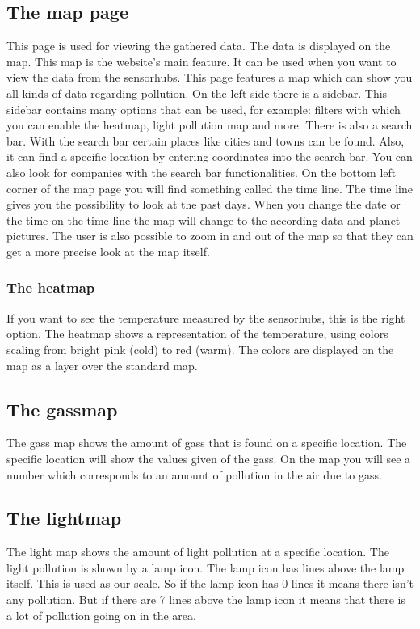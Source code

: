 \documentclass[a4paper]{article}
\begin{document}
\subsection{The map page}
This page is used for viewing the gathered data. The data is displayed on the map. This map is the website's main feature. It can be used when you want to view the data from the sensorhubs.
\newline
This page features a map which can show you all kinds of data regarding pollution. On the left side there is a sidebar. This sidebar contains many options that can be used, for example: filters with which you can enable the heatmap, light pollution map and more.
\newline
There is also a search bar. With the search bar certain places like cities and towns can be found. Also, it can find a specific location by entering coordinates into the search bar. You can also look for companies with the search bar functionalities.
\newline
On the bottom left corner of the map page you will find something called the time line. The time line gives you the possibility to look at the past days. When you change the date or the time on the time line the map will change to the according data and planet pictures.  
\newline
The user is also possible to zoom in and out of the map so that they can get a more precise look at the map itself. 
\newline

\subsubsection{The heatmap}
If you want to see the temperature measured by the sensorhubs, this is the right option.
The heatmap shows a representation of the temperature, using colors scaling from bright pink (cold) to red (warm). The colors are displayed on the map as a layer over the standard map.
\newline
\subsection{The gassmap} 
The gass map shows the amount of gass that is found on a specific location. The specific location will show the values given of the gass. On the map you will see a number which corresponds to an amount of pollution in the air due to gass.  

\subsection{The lightmap}
The light map shows the amount of light pollution at a specific location. The light pollution is shown by a lamp icon. The lamp icon has lines above the lamp itself. This is used as our scale. So if the lamp icon has 0 lines it means there isn't any pollution. But if there are 7 lines above the lamp icon it means that there is a lot of pollution going on in the area.
\noindent
\pagebreak
\end{document}
